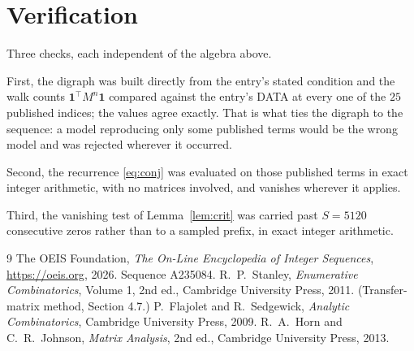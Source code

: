 \documentclass[11pt,a4paper]{article}
\theoremstyle{plain}
\theoremstyle{definition}
\begin{document}
\section{Verification}

Three checks, each independent of the algebra above.

First, the digraph was built directly from the entry's stated condition and the walk counts
$\mathbf{1}^{\!\top}M^{n}\mathbf{1}$ compared against the entry's DATA at every one of
the $25$ published indices; the values agree exactly. That is what ties the digraph to
the sequence: a model reproducing only some published terms would be the wrong model and
was rejected wherever it occurred.

Second, the recurrence \eqref{eq:conj} was evaluated on those published terms in exact
integer arithmetic, with no matrices involved, and vanishes wherever it applies.

Third, the vanishing test of Lemma~\ref{lem:crit} was carried past $S=5120$ consecutive
zeros rather than to a sampled prefix, in exact integer arithmetic.

\begin{thebibliography}{9}
 The OEIS Foundation, \emph{The On-Line Encyclopedia of Integer
Sequences}, \url{https://oeis.org}, 2026. Sequence A235084.
 R.~P.~Stanley, \emph{Enumerative Combinatorics}, Volume 1, 2nd ed.,
Cambridge University Press, 2011. (Transfer-matrix method, Section 4.7.)
 P.~Flajolet and R.~Sedgewick, \emph{Analytic Combinatorics}, Cambridge
University Press, 2009.
 R.~A.~Horn and C.~R.~Johnson, \emph{Matrix Analysis}, 2nd ed., Cambridge
University Press, 2013.
\end{thebibliography}
\end{document}
